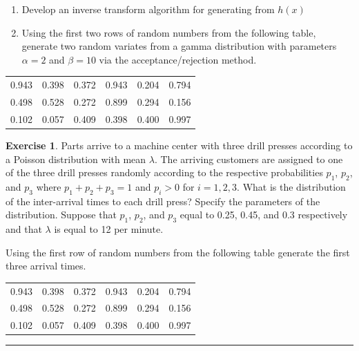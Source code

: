 \documentclass[
]{book}
\theoremstyle{definition}
\theoremstyle{definition}
\theoremstyle{definition}
\newtheorem{exercise}{Exercise}[chapter]
\theoremstyle{definition}
\theoremstyle{remark}
\begin{document}
\begin{enumerate}
\def\labelenumi{\alph{enumi}.}
\item
  Develop an inverse transform algorithm for generating from \(h(x)\)
\item
  Using the first two rows of random numbers from the following table, generate two random variates from a gamma distribution with parameters \(\alpha =2\) and \(\beta = 10\) via the
  acceptance/rejection method.
\end{enumerate}

\begin{longtable}[]{@{}cccccc@{}}
\toprule
\endhead
0.943 & 0.398 & 0.372 & 0.943 & 0.204 & 0.794 \\
0.498 & 0.528 & 0.272 & 0.899 & 0.294 & 0.156 \\
0.102 & 0.057 & 0.409 & 0.398 & 0.400 & 0.997 \\
\bottomrule
\end{longtable}

\begin{exercise}
\protect\hypertarget{exr:AppRNRVP32}{}{\label{exr:AppRNRVP32} }Parts arrive to a machine center with three drill presses according to a Poisson
distribution with mean \(\lambda\). The arriving customers are assigned to
one of the three drill presses randomly according to the respective
probabilities \(p_1\), \(p_2\), and \(p_3\) where \(p_1 + p_2 + p_3 = 1\) and
\(p_i > 0\) for \(i = 1, 2, 3\). What is the distribution of the
inter-arrival times to each drill press? Specify the parameters of the
distribution. Suppose that \(p_1\), \(p_2\), and \(p_3\) equal to 0.25, 0.45, and 0.3
respectively and that \(\lambda\) is equal to 12 per minute.
\end{exercise}

Using the first row of random numbers from the following table generate the first three arrival times.

\begin{longtable}[]{@{}cccccc@{}}
\toprule
\endhead
0.943 & 0.398 & 0.372 & 0.943 & 0.204 & 0.794 \\
0.498 & 0.528 & 0.272 & 0.899 & 0.294 & 0.156 \\
0.102 & 0.057 & 0.409 & 0.398 & 0.400 & 0.997 \\
\bottomrule
\end{longtable}

\begin{center}\rule{0.5\linewidth}{0.5pt}\end{center}
\end{document}
